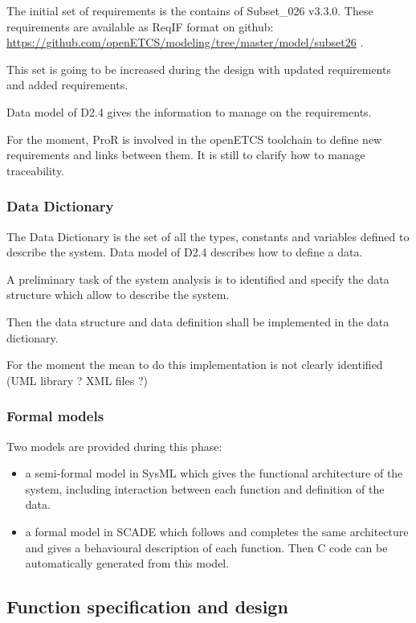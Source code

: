The initial  set of requirements is the contains of Subset\_026 v3.3.0. These requirements are available as ReqIF format on github: \url{https://github.com/openETCS/modeling/tree/master/model/subset26}
.

This set is going to be increased during the design with updated requirements and added requirements.

Data model of D2.4 gives the information to manage on the requirements.

For the moment, ProR is involved in the openETCS toolchain to define new requirements and links between them.
It is still to clarify how to manage traceability.



\subsubsection{Data Dictionary}

The Data Dictionary is the set of all the types, constants and variables defined to  describe the system.
Data model of D2.4 describes how to define a data.

A preliminary task of the system analysis is to identified and specify the data structure which allow to describe the system.

Then the data structure and data definition shall be implemented in the data dictionary.

For the moment the mean to do this implementation is not clearly identified (UML library ? XML files ?)


\subsubsection{Formal models}

Two  models are provided during this phase:
\begin{itemize}
\item  a semi-formal model in SysML which gives the functional architecture of the system, including interaction between each function  and definition of the data.
\item a formal model in SCADE which follows and completes the same architecture and gives a behavioural description of each function. Then C code can be automatically  generated from this model.
\end{itemize}

\subsection{Function specification and design}


